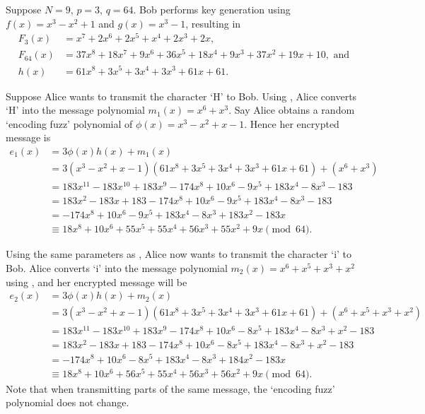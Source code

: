 \begin{example}\label{example-ntru-case-1}
    Suppose $N = 9$, $p = 3$, $q = 64$. Bob performs key generation using $f(x) = x^3 - x^2 + 1$ and $g(x) = x^3 - 1$, resulting in
    \begin{align*}
        F_3(x) &= x^7 + 2x^6 + 2x^5 +x^4 + 2x^3 + 2x,\\
        F_{64}(x) &= 37x^8 + 18x^7 + 9x^6 + 36x^5 + 18x^4 + 9x^3 + 37x^2 + 19x + 10, \text{ and}\\
        h(x) &= 61x^8 + 3x^5 + 3x^4 + 3x^3 + 61x + 61.
    \end{align*}

    Suppose Alice wants to transmit the character `H' to Bob. Using , Alice converts `H' into the message polynomial $m_1(x) = x^6 + x^3$. Say Alice obtains a random `encoding fuzz' polynomial of $\phi(x) = x^{3} - x^{2} + x - 1$. Hence her encrypted message is
    \begin{align*}
        e_1(x) &= 3\phi(x)h(x) + m_1(x)\\
        &= 3(x^3 -x^2 +x - 1)(61x^8 + 3x^5 + 3x^4 + 3x^3 + 61x + 61) + (x^6 + x^3)\\
        &= 183x^{11} - 183x^{10} + 183x^9 - 174x^8 + 10x^6 - 9x^5 + 183x^4 - 8x^3 - 183\\
        &= 183x^2 - 183x + 183 - 174x^8 + 10x^6 - 9x^5 + 183x^4 - 8x^3 - 183\\
        &= -174x^8 + 10x^6 - 9x^5 + 183x^4 - 8x^3 + 183x^2 - 183x\\
        &\equiv 18x^8 + 10x^6 + 55x^5 + 55x^4 + 56x^3 + 55x^2 + 9x \pmod{64}.
    \end{align*}
\end{example}

\begin{example}\label{example-ntru-case-2}
    Using the same parameters as , Alice now wants to transmit the character `i' to Bob. Alice converts `i' into the message polynomial $m_2(x) = x^6 + x^5 + x^3 + x^2$ using , and her encrypted message will be
    \begin{align*}
        e_2(x) &= 3\phi(x)h(x) + m_2(x)\\
        &= 3(x^3 - x^2 + x - 1)(61x^8 + 3x^5 + 3x^4 + 3x^3 + 61x + 61) + (x^6 + x^5 + x^3 + x^2)\\
        &= 183x^{11} - 183x^{10} + 183x^9 - 174x^8 + 10x^6 - 8x^5 + 183x^4 - 8x^3 + x^2 - 183\\
        &= 183x^2 - 183x + 183 - 174x^8 + 10x^6 - 8x^5 + 183x^4 - 8x^3 + x^2 - 183\\
        &= -174x^8 + 10x^6 - 8x^5 + 183x^4 - 8x^3 + 184x^2 - 183x\\
        &\equiv 18x^8 + 10x^6 + 56x^5 + 55x^4 + 56x^3 + 56x^2 + 9x \pmod{64}.
    \end{align*}
    Note that when transmitting parts of the same message, the `encoding fuzz' polynomial does not change.
\end{example}

